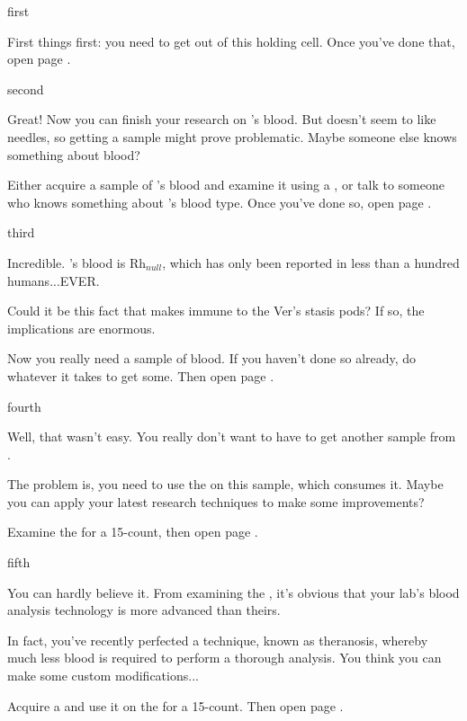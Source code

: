 \documentclass[greennotebook]{guildcamp4} %
\begin{document}
\startnotebook{\nSpiteNotebook{}}

\begin{page}{first}

First things first: you need to get out of this holding cell. Once you've done that, open page .

\end{page}

\begin{page}{second}

Great! Now you can finish your research on \cPlead{}'s blood. But \cPlead{\they} doesn't seem to like needles, so getting a sample might prove problematic. Maybe someone else knows something about  blood?

Either acquire a sample of \cPlead{}'s blood and examine it using a \iMicroscope{}, or talk to someone who knows something about \cPlead{}'s blood type. Once you've done so, open page .

\end{page}

\begin{page}{third}

Incredible. \cPlead{}'s blood is Rh$_{null}$, which has only been reported in less than a hundred humans...EVER.

Could it be this fact that makes \cPlead{} immune to the Ver's stasis pods? If so, the implications are enormous.

Now you really need a sample of \cPlead{\their} blood. If you haven't done so already, do whatever it takes to get some. Then open page .

\end{page}

\begin{page}{fourth}

Well, that wasn't easy. You really don't want to have to get another sample from \cPlead{}. 

The problem is, you need to use the \sBloodAnalyzer{} on this sample, which consumes it. Maybe you can apply your latest research techniques to make some improvements?

Examine the \sBloodAnalyzer{} for a 15-count, then open page .

\end{page}

\begin{page}{fifth}

You can hardly believe it. From examining the \sBloodAnalyzer{}, it's obvious that your lab's blood analysis technology is more advanced than theirs.

In fact, you've recently perfected a technique, known as theranosis, whereby much less blood is required to perform a thorough analysis. You think you can make some custom modifications...

Acquire a \iWrench{} and use it on the \sBloodAnalyzer{} for a 15-count. Then open page .

\end{page}
\end{document}

